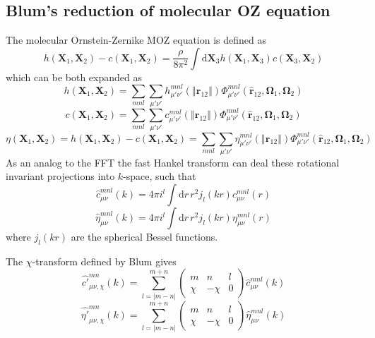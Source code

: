 \subsection{Blum's reduction of molecular OZ equation}

The molecular Ornstein-Zernike \acs{MOZ} equation is defined as
\begin{equation}
h(\mathbf{X}_{1},\mathbf{X}_{2})-c(\mathbf{X}_{1},\mathbf{X}_{2})=\frac{\rho}{8\pi^{2}}\int\mathrm{d}\mathbf{X}_{3}h(\mathbf{X}_{1},\mathbf{X}_{3})c(\mathbf{X}_{3},\mathbf{X}_{2})
\end{equation}
which can be both expanded as
\begin{equation}
h(\mathbf{X}_{1},\mathbf{X}_{2})=\sum_{mnl}\sum_{\mu'\nu'}h_{\mu'\nu'}^{mnl}(\left\Vert \mathbf{r}_{12}\right\Vert )\Phi_{\mu'\nu'}^{mnl}(\hat{\mathbf{r}}_{12},\mathbf{\Omega}_{1},\mathbf{\Omega}_{2})
\end{equation}
\begin{equation}
c(\mathbf{X}_{1},\mathbf{X}_{2})=\sum_{mnl}\sum_{\mu'\nu'}c_{\mu'\nu'}^{mnl}(\left\Vert \mathbf{r}_{12}\right\Vert )\Phi_{\mu'\nu'}^{mnl}(\hat{\mathbf{r}}_{12},\mathbf{\Omega}_{1},\mathbf{\Omega}_{2})
\end{equation}
\begin{equation}
\eta(\mathbf{X}_{1},\mathbf{X}_{2})=h(\mathbf{X}_{1},\mathbf{X}_{2})-c(\mathbf{X}_{1},\mathbf{X}_{2})=\sum_{mnl}\sum_{\mu'\nu'}\eta_{\mu'\nu'}^{mnl}(\left\Vert \mathbf{r}_{12}\right\Vert )\Phi_{\mu'\nu'}^{mnl}(\hat{\mathbf{r}}_{12},\mathbf{\Omega}_{1},\mathbf{\Omega}_{2})
\end{equation}
As an analog to the \acs{FFT} the fast Hankel transform can deal
these rotational invariant projections into $k$-space, such that
\begin{equation}
\hat{c}_{\mu\nu}^{mnl}(k)=4\pi i^{l}\int\mathrm{d}r\,r^{2}j_{l}(kr)c_{\mu\nu}^{mnl}(r)
\end{equation}
\begin{equation}
\hat{\eta}_{\mu\nu}^{mnl}(k)=4\pi i^{l}\int\mathrm{d}r\,r^{2}j_{l}(kr)\eta_{\mu\nu}^{mnl}(r)
\end{equation}
where $j_{l}(kr)$ are the spherical Bessel functions.

The $\chi$-transform defined by Blum gives
\begin{equation}
\hat{c'}_{\mu\nu,\chi}^{mn}(k)=\sum_{l=\left|m-n\right|}^{m+n}\left(\begin{array}{ccc}
m & n & l\\
\chi & -\chi & 0
\end{array}\right)\hat{c}_{\mu\nu}^{mnl}(k)
\end{equation}
\begin{equation}
\hat{\eta'}_{\mu\nu,\chi}^{mn}(k)=\sum_{l=\left|m-n\right|}^{m+n}\left(\begin{array}{ccc}
m & n & l\\
\chi & -\chi & 0
\end{array}\right)\hat{\eta}_{\mu\nu}^{mnl}(k)
\end{equation}

